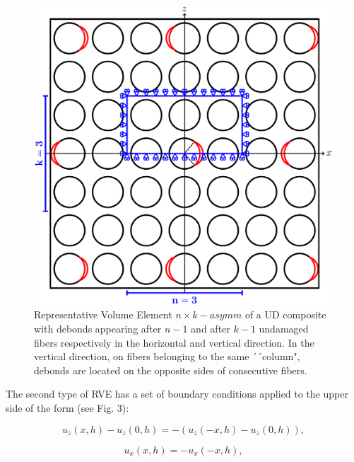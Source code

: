 \begin{figure}[!htb]
\centering
  \includegraphics[height=0.225\textheight]{paperD/asymm.pdf}
\caption{Representative Volume Element $n \times k-asymm$ of a UD composite with debonds appearing after $n-1$ and after $k-1$ undamaged fibers respectively in the horizontal and vertical direction. In the vertical direction, on fibers belonging to the same ´´column", debonds are located on the opposite sides of consecutive fibers.}\label{paperD:fig:asymm-rve}
\end{figure}

The second type of RVE has a set of boundary conditions applied to the upper side of the form (see Fig. 3):

\begin{equation}
u_{z}\left(x,h\right)-u_{z}\left(0,h\right)=-\left(u_{z}\left(-x,h\right)-u_{z}\left(0,h\right)\right),
\end{equation}

\begin{equation}
u_{x}\left(x,h\right)=-u_{x}\left(-x,h\right),
\end{equation}

